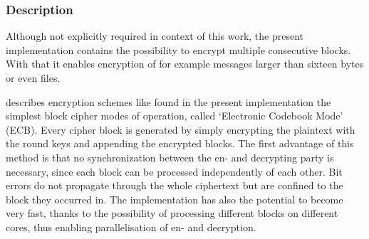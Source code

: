 \hypertarget{description-7}{%
\subsubsection{Description}\label{description-7}}

Although not explicitly required in context of this work, the present
implementation contains the possibility to encrypt multiple consecutive
blocks. With that it enables encryption of for example messages larger
than sixteen bytes or even files.

\cite[ch. 5.1.1]{paar} describes
encryption schemes like found in the present implementation the simplest
block cipher modes of operation, called `Electronic Codebook Mode' (ECB).
Every cipher block is generated by simply encrypting the plaintext with
the round keys and appending the encrypted blocks. The first advantage
of this method is that no synchronization between the en- and decrypting
party is necessary, since each block can be processed independently of
each other. Bit errors do not propagate through the whole ciphertext but
are confined to the block they occurred in. The implementation has also
the potential to become very fast, thanks to the possibility of
processing different blocks on different cores, thus enabling
parallelisation of en- and decryption.

